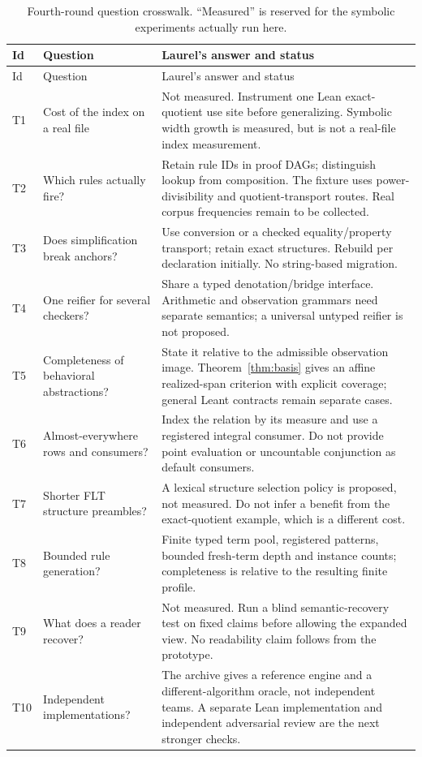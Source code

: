 \documentclass[11pt,a4paper]{article}
\theoremstyle{definition}
\theoremstyle{remark}
\begin{document}
{\small
\begin{longtable}{@{}P{.06\textwidth}P{.31\textwidth}P{.56\textwidth}@{}}
\caption{Fourth-round question crosswalk. ``Measured'' is reserved for the symbolic experiments actually run here.}\label{tab:questions}\\
\toprule Id & Question & Laurel's answer and status\\\midrule
\endfirsthead
\toprule Id & Question & Laurel's answer and status\\\midrule
\endhead
\bottomrule\endfoot
T1 & Cost of the index on a real file & Not measured. Instrument one Lean exact-quotient use site before generalizing. Symbolic width growth is measured, but is not a real-file index measurement.\\
T2 & Which rules actually fire? & Retain rule IDs in proof DAGs; distinguish lookup from composition. The fixture uses power-divisibility and quotient-transport routes. Real corpus frequencies remain to be collected.\\
T3 & Does simplification break anchors? & Use conversion or a checked equality/property transport; retain exact structures. Rebuild per declaration initially. No string-based migration.\\
T4 & One reifier for several checkers? & Share a typed denotation/bridge interface. Arithmetic and observation grammars need separate semantics; a universal untyped reifier is not proposed.\\
T5 & Completeness of behavioral abstractions? & State it relative to the admissible observation image. Theorem~\ref{thm:basis} gives an affine realized-span criterion with explicit coverage; general Leant contracts remain separate cases.\\
T6 & Almost-everywhere rows and consumers? & Index the relation by its measure and use a registered integral consumer. Do not provide point evaluation or uncountable conjunction as default consumers.\\
T7 & Shorter FLT structure preambles? & A lexical structure selection policy is proposed, not measured. Do not infer a benefit from the exact-quotient example, which is a different cost.\\
T8 & Bounded rule generation? & Finite typed term pool, registered patterns, bounded fresh-term depth and instance counts; completeness is relative to the resulting finite profile.\\
T9 & What does a reader recover? & Not measured. Run a blind semantic-recovery test on fixed claims before allowing the expanded view. No readability claim follows from the prototype.\\
T10 & Independent implementations? & The archive gives a reference engine and a different-algorithm oracle, not independent teams. A separate Lean implementation and independent adversarial review are the next stronger checks.\\
\end{longtable}}
\end{document}

